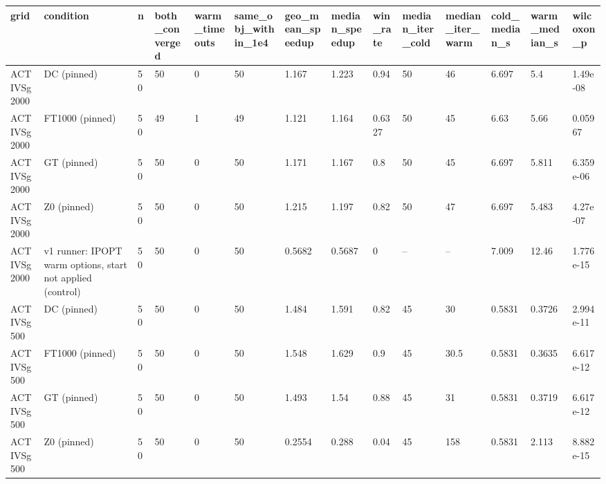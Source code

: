 \begin{tabular}{llllllllllllll}
\hline
grid & condition & n & both\_converged & warm\_timeouts & same\_obj\_within\_1e4 & geo\_mean\_speedup & median\_speedup & win\_rate & median\_iter\_cold & median\_iter\_warm & cold\_median\_s & warm\_median\_s & wilcoxon\_p \\
\hline
ACTIVSg2000 & DC (pinned) & 50 & 50 & 0 & 50 & 1.167 & 1.223 & 0.94 & 50 & 46 & 6.697 & 5.4 & 1.49e-08 \\
ACTIVSg2000 & FT1000 (pinned) & 50 & 49 & 1 & 49 & 1.121 & 1.164 & 0.6327 & 50 & 45 & 6.63 & 5.66 & 0.05967 \\
ACTIVSg2000 & GT (pinned) & 50 & 50 & 0 & 50 & 1.171 & 1.167 & 0.8 & 50 & 45 & 6.697 & 5.811 & 6.359e-06 \\
ACTIVSg2000 & Z0 (pinned) & 50 & 50 & 0 & 50 & 1.215 & 1.197 & 0.82 & 50 & 47 & 6.697 & 5.483 & 4.27e-07 \\
ACTIVSg2000 & v1 runner: IPOPT warm options, start not applied (control) & 50 & 50 & 0 & 50 & 0.5682 & 0.5687 & 0 & -- & -- & 7.009 & 12.46 & 1.776e-15 \\
ACTIVSg500 & DC (pinned) & 50 & 50 & 0 & 50 & 1.484 & 1.591 & 0.82 & 45 & 30 & 0.5831 & 0.3726 & 2.994e-11 \\
ACTIVSg500 & FT1000 (pinned) & 50 & 50 & 0 & 50 & 1.548 & 1.629 & 0.9 & 45 & 30.5 & 0.5831 & 0.3635 & 6.617e-12 \\
ACTIVSg500 & GT (pinned) & 50 & 50 & 0 & 50 & 1.493 & 1.54 & 0.88 & 45 & 31 & 0.5831 & 0.3719 & 6.617e-12 \\
ACTIVSg500 & Z0 (pinned) & 50 & 50 & 0 & 50 & 0.2554 & 0.288 & 0.04 & 45 & 158 & 0.5831 & 2.113 & 8.882e-15 \\
\hline
\end{tabular}
